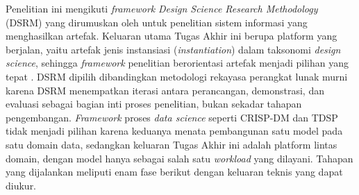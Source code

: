 Penelitian ini mengikuti \textit{framework} \textit{Design Science Research Methodology} (DSRM) yang dirumuskan oleh \textcite{peffers2007dsrm} untuk penelitian sistem informasi yang menghasilkan artefak. Keluaran utama Tugas Akhir ini berupa platform yang berjalan, yaitu artefak jenis instansiasi (\textit{instantiation}) dalam taksonomi \textit{design science}, sehingga \textit{framework} penelitian berorientasi artefak menjadi pilihan yang tepat \autocite{hevner2004design}. DSRM dipilih dibandingkan metodologi rekayasa perangkat lunak murni karena DSRM menempatkan iterasi antara perancangan, demonstrasi, dan evaluasi sebagai bagian inti proses penelitian, bukan sekadar tahapan pengembangan. \textit{Framework} proses \textit{data science} seperti CRISP-DM dan TDSP tidak menjadi pilihan karena keduanya menata pembangunan satu model pada satu domain data, sedangkan keluaran Tugas Akhir ini adalah platform lintas domain, dengan model hanya sebagai salah satu \textit{workload} yang dilayani. Tahapan yang dijalankan meliputi enam fase berikut dengan keluaran teknis yang dapat diukur.

